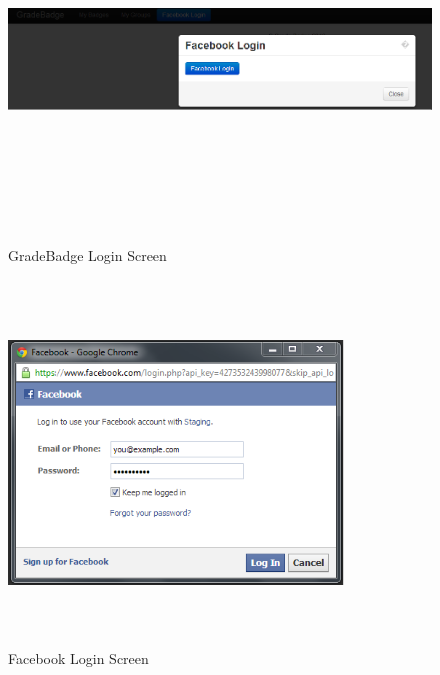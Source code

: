 \vspace{3em}
\begin{figure}[H]
\begin{center}
\includegraphics[height=3.8in,width=6.5in]{images/facebook-login.jpg}
\caption{GradeBadge Login Screen}
\label{fig:login_screen}
\end{center}
\end{figure}

\vspace{3em}
\begin{figure}[H]
\begin{center}
\includegraphics[height=3.8in,width=3.5in]{images/facebook-login1.jpg}
\caption{Facebook Login Screen}
\label{fig:fb_login_screen}
\end{center}
\end{figure}

